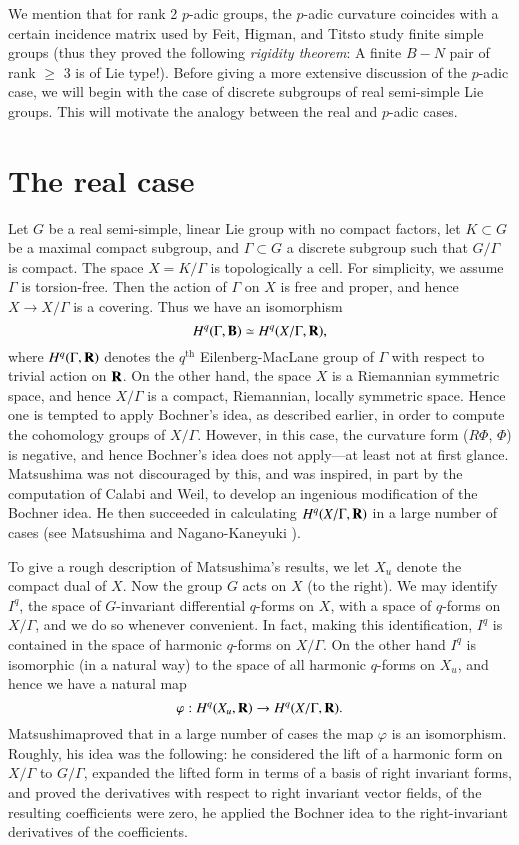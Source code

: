 We mention that for rank 2 $p$-adic groups, the $p$-adic curvature coincides with a certain incidence matrix used by Feit, Higman, and Tits\pageoriginale to study finite simple groups (thus they proved the following \textit{rigidity theorem}: A finite $B-N$ pair of rank $\geqslant$ 3 is of Lie type!). Before giving a more extensive discussion of the $p$-adic case, we will begin with the case of discrete subgroups of real semi-simple Lie groups. This will motivate the analogy between the real and $p$-adic cases.

\section{The real case}%
Let $G$ be a real semi-simple, linear Lie group with no compact factors, let $K \subset G$ be a maximal compact subgroup, and $\Gamma \subset G$ a discrete subgroup such that $G/\Gamma$ is compact. The space $X = K / \Gamma$ is topologically a cell. For simplicity, we assume $\Gamma$ is torsion-free. Then the action of $\Gamma$ on $X$ is free and proper, and hence $X \to X /\Gamma$ is a covering. Thus we have an isomorphism
$$
H^q (\Gamma, \mathbf{B}) \simeq H^q (X/\Gamma, \mathbf{R}),
$$
where $H^q (\Gamma, \mathbf{R})$ denotes the $q^{\text{th}}$ Eilenberg-MacLane group of $\Gamma$ with respect to trivial action on $\mathbf{R}$. On the other hand, the space $X$ is a Riemannian symmetric space, and hence $X/\Gamma$ is a compact, Riemannian, locally symmetric space. Hence one is tempted to apply Bochner's idea, as described earlier, in order to compute the cohomology groups of $X/\Gamma$. However, in this case, the curvature form ($R \Phi$, $\Phi$) is negative, and hence Bochner's idea does not apply---at least not at first glance. Matsushima was not discouraged by this, and was inspired, in part by the computation of Calabi and Weil, to develop an ingenious modification of the Bochner idea. He then succeeded in calculating $H^q (X/\Gamma, \mathbf{R})$ in a large number of cases (see Matsushima \cite{art3-key9} and Nagano-Kaneyuki \cite{art3-key10}).

To give a rough description of Matsushima's results, we let $X_u$ denote the compact dual of $X$. Now the group $G$ acts on $X$ (to the right). We may identify $I^q$, the space of $G$-invariant differential $q$-forms on $X$, with a space of $q$-forms on $X/\Gamma$, and we do so whenever convenient. In fact, making this identification, $I^q$ is contained in the space of harmonic $q$-forms on $X/\Gamma$. On the other hand $I^q$ is isomorphic (in a natural way) to the space of all harmonic $q$-forms on $X_u$, and hence we have a natural map
$$
\varphi : H^q (X_u, \mathbf{R}) \to H^q (X/ \Gamma, \mathbf{R}).
$$
Matsushima\pageoriginale proved that in a large number of cases the map $\varphi$ is an isomorphism. Roughly, his idea was the following: he considered the lift of a harmonic form on $X/\Gamma$ to $G/\Gamma$, expanded the lifted form in terms of a basis of right invariant forms, and proved the derivatives with respect to right invariant vector fields, of the resulting coefficients were zero, \iec he applied the Bochner idea to the right-invariant derivatives of the coefficients. 


